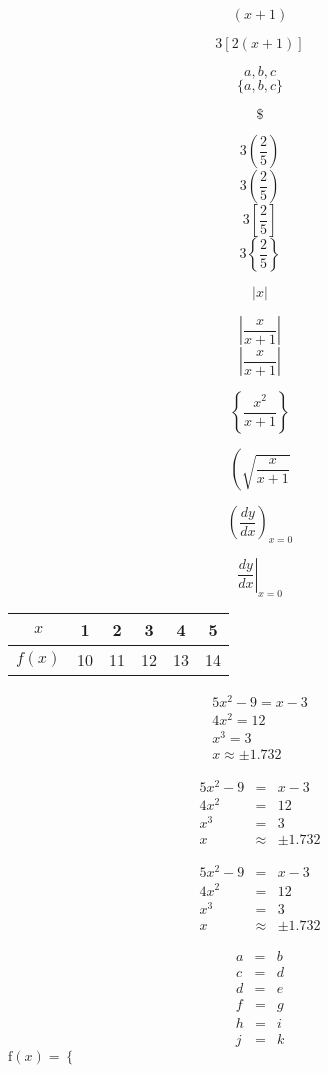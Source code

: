\documentclass[11pt]{article}
\begin{document}
$$(x+1)$$

$$3 [2 (x + 1) ]$$

$${a, b, c}$$
$$\{a, b, c\}$$

$$\$$$

$$3 (\frac{2}{5})$$
$$3 \left(\frac{2}{5}\right)$$
$$3 \left[\frac{2}{5}\right]$$
$$3 \left\{ \frac{2}{5}\right\}$$

$$|x|$$

$$|\frac{x}{x+1}|$$
$$\left| \frac{x}{x+1} \right|$$

$$ \left\{
	\frac{x^2}{x + 1}
	\right\} $$
	
$$ \left(
	\sqrt{
	\frac{x}{x+1}}
	\right. $$


$$ \left(
	\frac{dy}{dx}
	\right)_{x = 0} $$

$$ \left.
	\frac{dy}{dx}
	\right|_{x = 0} $$
	
\begin{tabular}{|c|ccccc|}
\hline
$x$ 	& 1	& 2	& 3	& 4	& 5	 \\  \hline
$f(x)$	& 10	& 11	& 12	& 13	& 14 \\ \hline

\end{tabular}

\begin{eqnarray}
5x^2 - 9 = x-3 \\
4x^2 = 12 \\
x^3 = 3 \\
x \approx\pm 1.732
\end{eqnarray}

\begin{eqnarray}
5x^2 - 9 &=& x-3 \nonumber\\
4x^2 &=& 12 \nonumber\\
x^3 &=& 3 \\
x &\approx&\pm 1.732
\end{eqnarray}

\begin{eqnarray*}
5x^2 - 9 &=& x-3 \\
4x^2 &=& 12 \\
x^3 &=& 3 \\
x &\approx&\pm 1.732
\end{eqnarray*}

\begin{eqnarray}
a &=& b\\
c &=& d\\
d &=& e
\end{eqnarray} 
\setcounter{equation}{0} 
\begin{eqnarray}
f &=& g\\
h &=& i\\
j &=& k
\end{eqnarray}
$\mathrm{f}(x) = \left\lbrace \right.$
\end{document}
